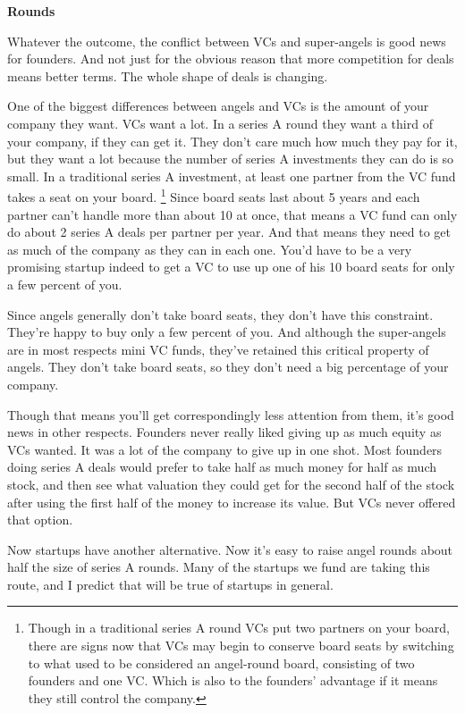 \documentclass[12pt]{book}
\begin{document}
\textbf{Rounds}

Whatever the outcome, the conflict between VCs and super-angels is good
news for founders. And not just for the obvious reason that more
competition for deals means better terms. The whole shape of deals is
changing.

One of the biggest differences between angels and VCs is the amount of
your company they want. VCs want a lot. In a series A round they want a
third of your company, if they can get it. They don't care much how much
they pay for it, but they want a lot because the number of series A
investments they can do is so small. In a traditional series A
investment, at least one partner from the VC fund takes a seat on your
board. \footnote{Though in a traditional series A round VCs put two partners on
your board, there are signs now that VCs may begin to conserve board
seats by switching to what used to be considered an angel-round board,
consisting of two founders and one VC. Which is also to the founders'
advantage if it means they still control the company.} Since board seats last about 5 years and
each partner can't handle more than about 10 at once, that means a VC
fund can only do about 2 series A deals per partner per year. And that
means they need to get as much of the company as they can in each one.
You'd have to be a very promising startup indeed to get a VC to use up
one of his 10 board seats for only a few percent of you.

Since angels generally don't take board seats, they don't have this
constraint. They're happy to buy only a few percent of you. And although
the super-angels are in most respects mini VC funds, they've retained
this critical property of angels. They don't take board seats, so they
don't need a big percentage of your company.

Though that means you'll get correspondingly less attention from them,
it's good news in other respects. Founders never really liked giving up
as much equity as VCs wanted. It was a lot of the company to give up in
one shot. Most founders doing series A deals would prefer to take half
as much money for half as much stock, and then see what valuation they
could get for the second half of the stock after using the first half of
the money to increase its value. But VCs never offered that option.

Now startups have another alternative. Now it's easy to raise angel
rounds about half the size of series A rounds. Many of the startups we
fund are taking this route, and I predict that will be true of startups
in general.
\end{document}
